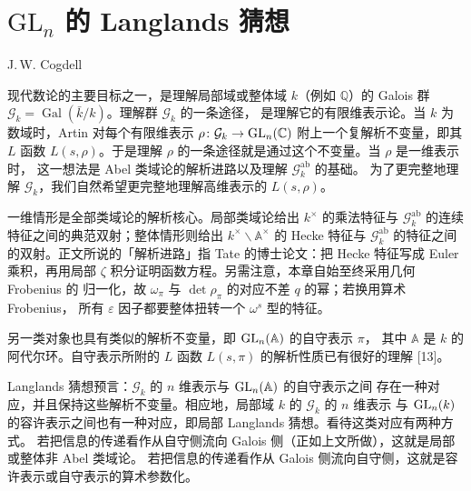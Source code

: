 \chapter{$\mathrm{GL}_n$ 的 Langlands 猜想}\label{ch:10}

\begin{center}
J.\,W. Cogdell
\end{center}

现代数论的主要目标之一，是理解局部域或整体域 $k$（例如 $\mathbb{Q}$）的 Galois 群
$\mathcal{G}_k=\operatorname{Gal}(\bar k/k)$。理解群 $\mathcal{G}_k$ 的一条途径，
是理解它的有限维表示论。当 $k$ 为数域时，Artin 对每个有限维表示
$\rho\colon\mathcal{G}_k\to\mathrm{GL}_n(\mathbb{C})$ 附上一个复解析不变量，即其 $L$ 函数
$L(s,\rho)$。于是理解 $\rho$ 的一条途径就是通过这个不变量。当 $\rho$ 是一维表示时，
这一想法是 Abel 类域论的解析进路以及理解 $\mathcal{G}_k^{\mathrm{ab}}$ 的基础。
为了更完整地理解 $\mathcal{G}_k$，我们自然希望更完整地理解高维表示的 $L(s,\rho)$。
\begin{annote}
一维情形是全部类域论的解析核心。局部类域论给出 $k^\times$ 的乘法特征与
$\mathcal{G}_k^{\mathrm{ab}}$ 的连续特征之间的典范双射；整体情形则给出
$k^\times\backslash\mathbb{A}^\times$ 的 Hecke 特征与 $\mathcal{G}_k^{\mathrm{ab}}$
的特征之间的双射。正文所说的「解析进路」指 Tate 的博士论文：把 Hecke 特征写成 Euler
乘积，再用局部 $\zeta$ 积分证明函数方程。另需注意，本章自始至终采用几何 Frobenius 的
归一化，故 $\omega_\pi$ 与 $\det\rho_\pi$ 的对应不差 $q$ 的幂；若换用算术 Frobenius，
所有 $\varepsilon$ 因子都要整体扭转一个 $\omega^s$ 型的特征。
\par{}
\end{annote}

另一类对象也具有类似的解析不变量，即 $\mathrm{GL}_n(\mathbb{A})$ 的自守表示 $\pi$，
其中 $\mathbb{A}$ 是 $k$ 的阿代尔环。自守表示所附的 $L$ 函数 $L(s,\pi)$
的解析性质已有很好的理解 [13]。

Langlands 猜想预言：$\mathcal{G}_k$ 的 $n$ 维表示与 $\mathrm{GL}_n(\mathbb{A})$ 的自守表示之间
存在一种对应，并且保持这些解析不变量。相应地，局部域 $k$ 的 $\mathcal{G}_k$ 的 $n$ 维表示
与 $\mathrm{GL}_n(k)$ 的容许表示之间也有一种对应，即局部 Langlands 猜想。看待这类对应有两种方式。
若把信息的传递看作从自守侧流向 Galois 侧（正如上文所做），这就是局部或整体非 Abel 类域论。
若把信息的传递看作从 Galois 侧流向自守侧，这就是容许表示或自守表示的算术参数化。

